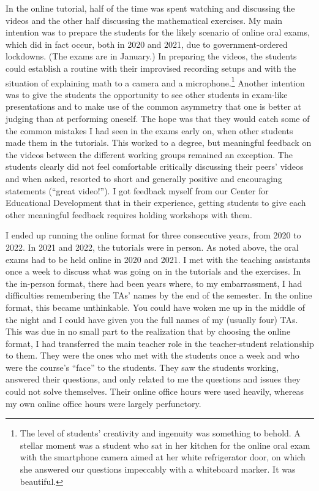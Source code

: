 \documentclass[10pt]{article}
\begin{document}
In the online tutorial, half of the time was spent watching and discussing the videos and the other half discussing the mathematical exercises. My main intention was to prepare the students for the likely scenario of online oral exams, which did in fact occur, both in 2020 and 2021, due to government-ordered lockdowns. (The exams are in January.) In preparing the videos, the students could establish a routine with their improvised recording setups and with the situation of explaining math to a camera and a microphone.\footnote{The level of students' creativity and ingenuity was something to behold. A stellar moment was a student who sat in her kitchen for the online oral exam with the smartphone camera aimed at her white refrigerator door, on which she answered our questions impeccably with a whiteboard marker. It was beautiful.} Another intention was to give the students the opportunity to see other students in exam-like presentations and to make use of the common asymmetry that one is better at judging than at performing oneself. The hope was that they would catch some of the common mistakes I had seen in the exams early on, when other students made them in the tutorials. This worked to a degree, but meaningful feedback on the videos between the different working groups remained an exception. The students clearly did not feel comfortable critically discussing their peers' videos and when asked, resorted to short and generally positive and encouraging statements (``great video!''). I got feedback myself from our Center for Educational Development that in their experience, getting students to give each other meaningful feedback requires holding workshops with them.  

I ended up running the online format for three consecutive years, from 2020 to 2022. In 2021 and 2022, the tutorials were in person. As noted above, the oral exams had to be held online in 2020 and 2021. I met with the teaching assistants once a week to discuss what was going on in the tutorials and the exercises. In the in-person format, there had been years where, to my embarrassment, I had difficulties remembering the TAs' names by the end of the semester. In the online format, this became unthinkable. You could have woken me up in the middle of the night and I could have given you the full names of my (usually four) TAs. This was due in no small part to the realization that by choosing the online format, I had transferred the main teacher role in the teacher-student relationship to them. They were the ones who met with the students once a week and who were the course's ``face'' to the students. They saw the students working, answered their questions, and only related to me the questions and issues they could not solve themselves. Their online office hours were used heavily, whereas my own online office hours were largely perfunctory. 
\end{document}
